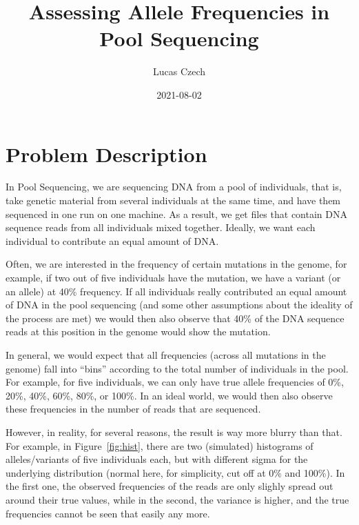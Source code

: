 \documentclass[letterpaper,10pt]{scrartcl}
\title{Assessing Allele Frequencies in Pool Sequencing}
\author{Lucas Czech}
\date{2021-08-02}
\begin{document}
\maketitle

\section*{Problem Description}
\label{sec:ProbDescr}

In Pool Sequencing, we are sequencing DNA from a pool of individuals, that is,
take genetic material from several individuals at the same time, and have them sequenced in one run on one machine.
As a result, we get files that contain DNA sequence reads from all individuals mixed together.
Ideally, we want each individual to contribute an equal amount of DNA.

Often, we are interested in the frequency of certain mutations in the genome,
for example, if two out of five individuals have the mutation, we have a variant (or an allele) at 40\% frequency.
If all individuals really contributed an equal amount of DNA in the pool sequencing
(and some other assumptions about the ideality of the process are met)
we would then also observe that 40\% of the DNA sequence reads at this position in the genome would show the mutation.

In general, we would expect that all frequencies (across all mutations in the genome) fall into ``bins''
according to the total number of individuals in the pool.
For example, for five individuals, we can only have true allele frequencies of 0\%, 20\%, 40\%, 60\%, 80\%, or 100\%.
In an ideal world, we would then also observe these frequencies in the number of reads that are sequenced.

However, in reality, for several reasons, the result is way more blurry than that.
For example, in Figure~\ref{fig:hist}, there are two (simulated) histograms of alleles/variants of five individuals each,
but with different sigma for the underlying distribution (normal here, for simplicity, cut off at 0\% and 100\%).
In the first one, the observed frequencies of the reads are only slighly spread out around their true values,
while in the second, the variance is higher, and the true frequencies cannot be seen that easily any more.
\end{document}
